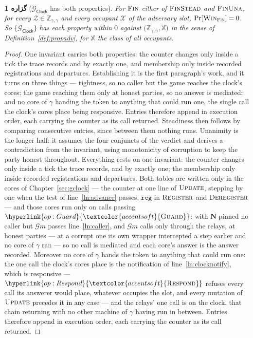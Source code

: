 \documentclass[10pt,oneside,openany]{book}
\newcommand{\admits}{\mathbf{N}}
\newcommand{\Zenv}{\mathcal{Z}}
\newcommand{\ZenvSet}{\mathbb{Z}}
\newcommand{\op}[1]{\textnormal{\textsc{#1}}}
\newcommand{\opl}[1]{\hyperlink{op:#1}{\textcolor{accentsoft}{\op{#1}}}}
\newcommand{\Gm}{\mathcal{G}m}
\newcommand{\Xset}{\mathbb{X}}
\newcommand{\Win}{\op{Win}}
\newcommand{\Gclock}{\mathcal{G}_{\mathsf{Clock}}}
\newcommand{\V}[1]{\mathtt{#1}}
\theoremstyle{accentdef}
\theoremstyle{accentplain}
\newtheorem{proposition}[definition]{گزاره}
\begin{document}
\begin{proposition}[$\Gclock$ has both properties]\label{prop:clockprops}
For $\op{Fin}$ either of $\op{FinStead}$ and $\op{FinUna}$, for every
$\Zenv \in \ZenvSet_{\gamma,\gamma}$ and every occupant $\mathcal{X}$ of the adversary slot,
$\Pr[\Win_{\op{Fin}}] = 0$. So $\{\Gclock\}$ has each property within $0$ against
$\bigl(\ZenvSet_{\gamma,\gamma},\Xset\bigr)$ in the sense of Definition~\ref{def:propadv}, for
$\Xset$ the class of all occupants.
\end{proposition}

\begin{proof}
One invariant carries both properties: the counter changes only inside a tick the trace records and
by exactly one, and membership only inside recorded registrations and departures. Establishing it is
the first paragraph's work, and it turns on three things --- tightness, so no caller but the game
reaches the clock's cores; the game reaching them only at honest parties, so no answer is mediated;
and no core of $\gamma$ handing the token to anything that could run one, the single call the
clock's cores place being responsive. Entries therefore append in execution order, each carrying the
counter as its call returned. Steadiness then follows by comparing consecutive entries, since
between them nothing runs. Unanimity is the longer half: it assumes the four conjuncts of the
verdict and derives a contradiction from the invariant, using monotonicity of corruption to keep the
party honest throughout.
Everything rests on one invariant: the counter changes only inside a tick the trace records, and
by exactly one; the membership only inside recorded registrations and departures. Both tables are
written only in the cores of Chapter~\ref{sec:gclock} --- the counter at one line of
$\op{Update}$, stepping by one when the test of line~\ref{ln:advance} passes, $\V{reg}$ in
$\op{Register}$ and $\op{Deregister}$ --- and those cores run only on calls passing
$\opl{Guard}$: with $\admits$ pinned no caller but $\Gm$ passes line~\ref{ln:caller}, and $\Gm$
calls only through the relays, at honest parties --- at a corrupt one its own wrapper intercepted
a step earlier and no core of $\gamma$ ran --- so no call is mediated and each core's answer is
the answer recorded. Moreover no core of $\gamma$ hands the token to anything that could run one:
the one call the clock's cores place is the notification of line~\ref{ln:clocknotify}, which is
responsive --- $\opl{Respond}$ refuses every call its answerer would place, whatever occupies the
slot, and every mutation of $\op{Update}$ precedes it in any case --- and the relays' one call is
on the clock, that chain returning with no other machine of $\gamma$ having run in between.
Entries therefore append in execution order, each carrying the counter as its call returned.


\end{proof}
\end{document}
